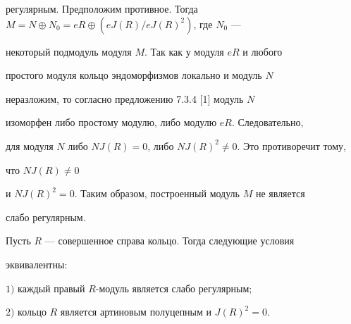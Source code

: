 \begin{pf}
регулярным. Предположим противное. Тогда $M=N\oplus N_0=eR\oplus 


(eJ(R)/eJ(R)^2)$, где $N_0$ --- 


некоторый подмодуль модуля $M$. Так как у модуля $eR$ и любого 


простого модуля кольцо эндоморфизмов локально и модуль $N$ 


неразложим, то согласно предложению 7.3.4 [1] модуль $N$ 


изоморфен либо простому модулю, либо модулю $eR$. Следовательно, 


для модуля $N$ либо $NJ(R)=0$, либо $NJ(R)^2\ne0$. Это противоречит тому, 


что $NJ(R)\ne0$ 


и $NJ(R)^2=0$. Таким образом, построенный модуль $M$ не является 


слабо регулярным. 


\end{pf} 


 


\begin{thm} 


Пусть $R$ --- совершенное справа кольцо. Тогда следующие условия 


эквивалентны\/${:}$ 


 


$1)$ каждый правый $R$-модуль является слабо регулярным$;$ 


 


$2)$ кольцо $R$ является артиновым полуцепным и $J(R)^2=0$. 


\end{thm} 


 


